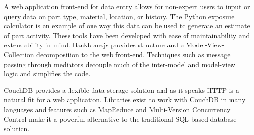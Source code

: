 \documentclass[journal]{IEEEtran}
\begin{document}
A web application front-end for data entry allows for non-expert users to input
or query data on part type, material, location, or history. The Python exposure
calculator is an example of one way this data can be used to generate an estimate
of part activity. These tools have been developed with ease of maintainability and
extendability in mind. Backbone.js provides structure and a Model-View-Collection
decomposition to the web front-end. Techniques such as message passing through mediators
decouple much of the inter-model and model-view logic and simplifies the code.

CouchDB provides a flexible data storage solution and as it speaks HTTP is a natural
fit for a web application. Libraries exist to work with CouchDB in many languages and
features such as MapReduce and Multi-Version Concurrency Control make it a powerful
alternative to the traditional SQL based database solution.

%
%



%
%
\end{document}
